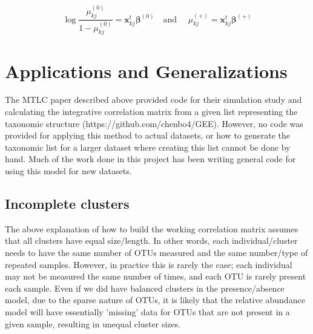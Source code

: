 \documentclass[12pt]{article}
\begin{document}
$$\log \frac{\mu_{kj}^{(0)}}{1 - \mu_{kj}^{(0)}} = \mathbf{x}_{kj}^t \boldsymbol\beta^{(0)} \quad \text{and } \quad \mu_{kj}^{(+)} = \mathbf{x}_{kj}^t \boldsymbol\beta^{(+)}$$




%
%
%



\section{Applications and Generalizations}

The MTLC paper described above \cite{chen2020generalized} provided code for their simulation study and calculating the integrative correlation matrix from a given list representing the taxonomic structure (https://github.com/chenbo4/GEE). However, no code was provided for applying this method to actual datasets, or how to generate the taxonomic list for a larger dataset where creating this list cannot be done by hand. Much of the work done in this project has been writing general code for using this model for new datasets.

\subsection{Incomplete clusters}
The above explanation of how to build the working correlation matrix assumes that all clusters have equal size/length. In other words, each individual/cluster needs to have the same number of OTUs measured and the same number/type of repeated samples. However, in practice this is rarely the case; each individual may not be measured the same number of times, and each OTU is rarely present each sample. Even if we did have balanced clusters in the presence/absence model, due to the sparse nature of OTUs, it is likely that the relative abundance model will have essentially 'missing' data for OTUs that are not present in a given sample, resulting in unequal cluster sizes.
\end{document}
